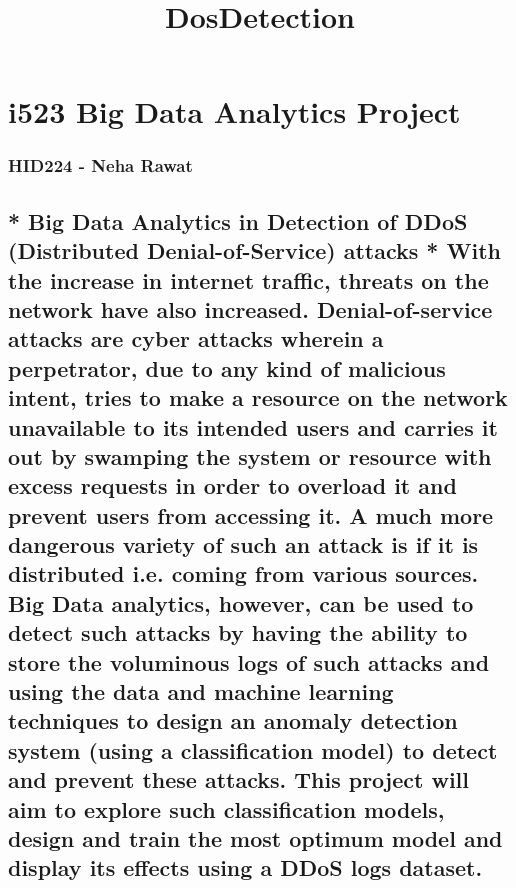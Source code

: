 \documentclass[11pt]{article}
\title{DosDetection}
\begin{document}
    
    
    \maketitle
    
    

    
    \section{i523 Big Data Analytics
Project}\label{i523-big-data-analytics-project}

\subsubsection{HID224 - Neha Rawat}\label{hid224---neha-rawat}

\subsection{* Big Data Analytics in Detection of DDoS (Distributed
Denial-of-Service) attacks * With the increase in internet traffic,
threats on the network have also increased. Denial-of-service attacks
are cyber attacks wherein a perpetrator, due to any kind of malicious
intent, tries to make a resource on the network unavailable to its
intended users and carries it out by swamping the system or resource
with excess requests in order to overload it and prevent users from
accessing it. A much more dangerous variety of such an attack is if it
is distributed i.e. coming from various sources. Big Data analytics,
however, can be used to detect such attacks by having the ability to
store the voluminous logs of such attacks and using the data and machine
learning techniques to design an anomaly detection system (using a
classification model) to detect and prevent these attacks. This project
will aim to explore such classification models, design and train the
most optimum model and display its effects using a DDoS logs
dataset.}\label{big-data-analytics-in-detection-of-ddos-distributed-denial-of-service-attacks-with-the-increase-in-internet-traffic-threats-on-the-network-have-also-increased.-denial-of-service-attacks-are-cyber-attacks-wherein-a-perpetrator-due-to-any-kind-of-malicious-intent-tries-to-make-a-resource-on-the-network-unavailable-to-its-intended-users-and-carries-it-out-by-swamping-the-system-or-resource-with-excess-requests-in-order-to-overload-it-and-prevent-users-from-accessing-it.-a-much-more-dangerous-variety-of-such-an-attack-is-if-it-is-distributed-i.e.-coming-from-various-sources.-big-data-analytics-however-can-be-used-to-detect-such-attacks-by-having-the-ability-to-store-the-voluminous-logs-of-such-attacks-and-using-the-data-and-machine-learning-techniques-to-design-an-anomaly-detection-system-using-a-classification-model-to-detect-and-prevent-these-attacks.-this-project-will-aim-to-explore-such-classification-models-design-and-train-the-most-optimum-model-and-display-its-effects-using-a-ddos-logs-dataset.}
\end{document}
